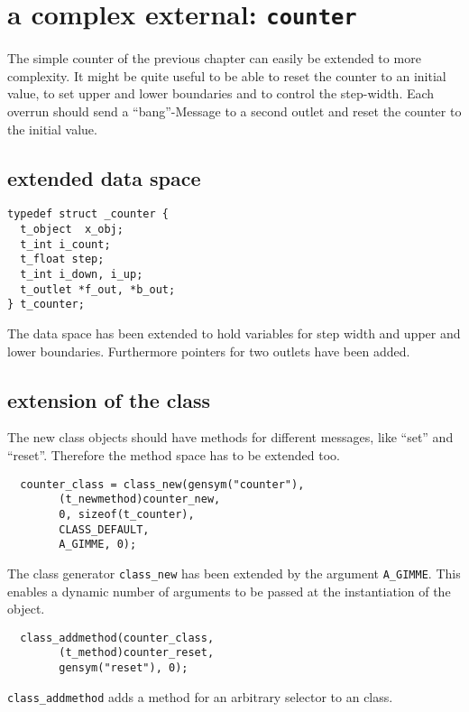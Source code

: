 \documentclass[12pt, a4paper,english,titlepage]{article}
\begin{document}
\section{a complex external: \tt counter}

The simple counter of the previous chapter can easily be extended to more complexity.
It might be quite useful to be able to reset the counter to an initial value,
to set upper and lower boundaries and to control the step-width.
Each overrun should send a ``bang''-Message to a second outlet and reset the counter to
the initial value.

\subsection{extended data space}

\begin{verbatim}
typedef struct _counter {
  t_object  x_obj;
  t_int i_count;
  t_float step;
  t_int i_down, i_up;
  t_outlet *f_out, *b_out;
} t_counter;
\end{verbatim}

The data space has been extended to hold variables for step width and 
upper and lower boundaries.
Furthermore pointers for two outlets have been added.

\subsection{extension of the class}
The new class objects should have methods for different messages,
like ``set'' and ``reset''.
Therefore the method space has to be extended too.

\begin{verbatim}
  counter_class = class_new(gensym("counter"),
        (t_newmethod)counter_new,
        0, sizeof(t_counter),
        CLASS_DEFAULT, 
        A_GIMME, 0);
\end{verbatim}

The class generator \verb+class_new+ has been extended by the argument \verb+A_GIMME+.
This enables a dynamic number of arguments to be passed at the instantiation of the object.

\begin{verbatim}
  class_addmethod(counter_class,
        (t_method)counter_reset,
        gensym("reset"), 0);
\end{verbatim}

\verb+class_addmethod+ adds a method for an arbitrary selector to an class.
\end{document}
